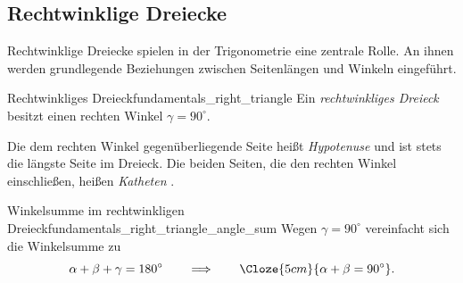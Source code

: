 \subsection{Rechtwinklige Dreiecke}
\label{subsec:fundamentals_right_triangles}

Rechtwinklige Dreiecke spielen in der Trigonometrie eine zentrale Rolle. An
ihnen werden grundlegende Beziehungen zwischen Seitenlängen und Winkeln
eingeführt.

\begin{DefinitionBox}{Rechtwinkliges Dreieck}{fundamentals_right_triangle}
  Ein \emph{rechtwinkliges Dreieck}  besitzt einen
  rechten Winkel $\gamma=90^\circ$.
  \begin{center}
  \end{center}
  Die dem rechten Winkel gegenüberliegende Seite heißt \emph{Hypotenuse}
   und ist stets die längste Seite im Dreieck. Die beiden Seiten,
  die den rechten Winkel einschließen, heißen \emph{Katheten} .
\end{DefinitionBox}

\begin{KeyPointBox}{Winkelsumme im rechtwinkligen Dreieck}{fundamentals_right_triangle_angle_sum}
  Wegen $\gamma=90^\circ$ vereinfacht sich die Winkelsumme zu
  \[
      \alpha + \beta + \gamma = 180^\circ
      \qquad\Longrightarrow\qquad
      \Cloze{5cm}{\alpha +\beta =90^\circ}.
  \]
\end{KeyPointBox}







